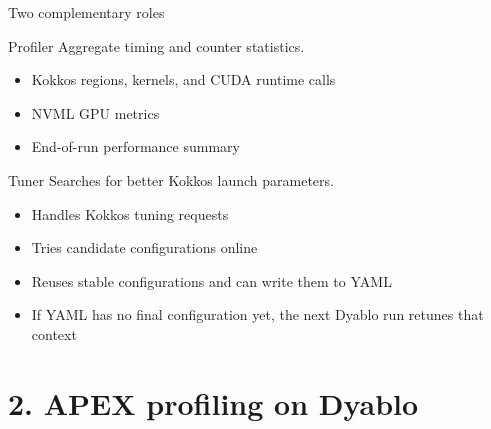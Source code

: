 \documentclass[11pt]{beamer}
\begin{document}
\begin{frame}[t]{Two complementary roles}
\begin{beamerboxesrounded}[upper=profiler title,lower=profiler body,width=\linewidth,shadow=false]{Profiler}
\small
Aggregate timing and counter statistics.
\vspace{0.5em}
\begin{itemize}\itemsep0.3em
    \item Kokkos regions, kernels, and CUDA runtime calls
    \item NVML GPU metrics
    \item End-of-run performance summary
\end{itemize}
\end{beamerboxesrounded}

\vspace{0.8em}

\begin{beamerboxesrounded}[upper=tuner title,lower=tuner body,width=\linewidth,shadow=false]{Tuner}
\small
Searches for better Kokkos launch parameters.
\vspace{0.35em}
\begin{itemize}\itemsep0.22em
    \item Handles Kokkos tuning requests
    \item Tries candidate configurations online
    \item Reuses stable configurations and can write them to YAML
    \item If YAML has no final configuration yet, the next Dyablo run retunes that context
\end{itemize}
\end{beamerboxesrounded}
\end{frame}

\section{2. APEX profiling on Dyablo}
\end{document}
